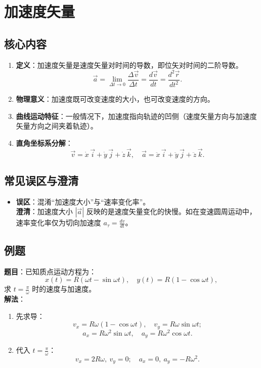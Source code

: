 \section{加速度矢量}
\subsection{核心内容}
\begin{enumerate}
    \item \textbf{定义}：加速度矢量是速度矢量对时间的导数，即位矢对时间的二阶导数。
          \[
              \vec{a} = \lim_{\Delta t \to 0} \frac{\Delta \vec{v}}{\Delta t} = \frac{d\vec{v}}{dt} = \frac{d^2 \vec{r}}{dt^2}.
          \]
    \item \textbf{物理意义}：加速度既可改变速度的大小，也可改变速度的方向。
    \item \textbf{曲线运动特征}：一般情况下，加速度指向轨迹的凹侧（速度矢量方向与加速度矢量方向之间夹着轨迹）。
    \item \textbf{直角坐标系分解}：
          \[
              \vec{v} = \dot{x}\,\vec{i} + \dot{y}\,\vec{j} + \dot{z}\,\vec{k},\quad
              \vec{a} = \ddot{x}\,\vec{i} + \ddot{y}\,\vec{j} + \ddot{z}\,\vec{k}.
          \]
\end{enumerate}

\subsection{常见误区与澄清}
\begin{itemize}
    \item \textbf{误区}：混淆“加速度大小”与“速率变化率”。\\
          \textbf{澄清}：加速度大小 $|\vec{a}|$ 反映的是速度矢量变化的快慢。如在变速圆周运动中，速率变化率仅为切向加速度 $a_\tau = \frac{dv}{dt}$。
\end{itemize}

\subsection{例题}
\textbf{题目}：已知质点运动方程为：
\[
    x(t) = R(\omega t - \sin\omega t),\quad y(t) = R(1 - \cos\omega t),
\]
求 $t = \frac{\pi}{\omega}$ 时的速度与加速度。\\

\textbf{解法}：
\begin{enumerate}
    \item 先求导：
          \[
              v_x = R\omega(1 - \cos\omega t),\quad v_y = R\omega\sin\omega t;
          \]
          \[
              a_x = R\omega^2\sin\omega t,\quad a_y = R\omega^2\cos\omega t.
          \]
    \item 代入 $t = \frac{\pi}{\omega}$：
          \[
              v_x = 2R\omega,\ v_y = 0;\quad a_x = 0,\ a_y = -R\omega^2.
          \]
\end{enumerate}

